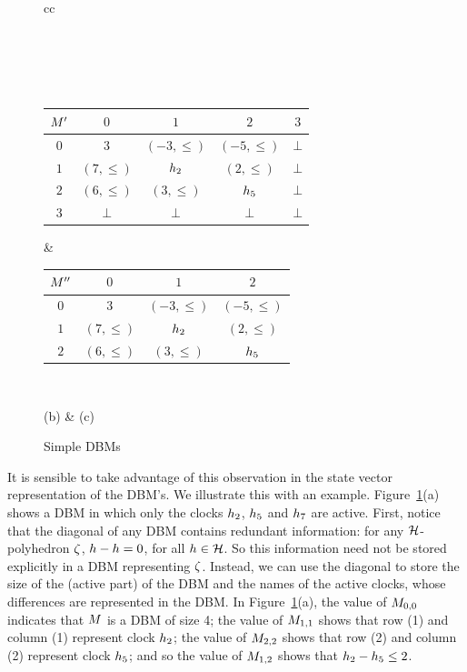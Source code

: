 \begin{description}
\begin{figure}
\begin{center}
\begin{tabular}{cc}
{\begin{tabular}{|>{$}c<{$}|>{$}c<{$}>{$}c<{$}>{$}c<{$}>{$}c<{$}|}
\hline
\end{tabular}
}
\\
 \\ \\
\begin{tabular}{|>{$}c<{$}|>{$}c<{$}>{$}c<{$}>{$}c<{$}>{$}c<{$}|}
\hline
\M' & 0        & 1         & 2         & 3           \\
\hline
0   & 3        & (-3,\leq) & (-5,\leq) & \bot        \\
1   & (7,\leq) & \clock_2  & (2,\leq)  & \bot        \\
2   & (6,\leq) & (3,\leq)  & \clock_5  & \bot        \\
3   & \bot     & \bot      & \bot      & \bot        \\
\hline
\end{tabular}
&
\begin{tabular}{|>{$}c<{$}|>{$}c<{$}>{$}c<{$}>{$}c<{$}|}
\hline
\M''& 0        & 1         & 2         \\
\hline
0   & 3        & (-3,\leq) & (-5,\leq) \\
1   & (7,\leq) & \clock_2  & (2,\leq)  \\
2   & (6,\leq) & (3,\leq)  & \clock_5  \\
\hline
\end{tabular}
\\
\rule{0cm}{.5cm}(b) & (c) \\
\end{tabular}
\end{center}
\caption{Simple DBMs\label{fig:sgdbms}}
\end{figure}
It is sensible to take advantage of this observation in the state
vector representation of the DBM's. We illustrate this with an
example.  Figure~\ref{fig:sgdbms}(a) shows a DBM in which only the
clocks $\clock_2$, $\clock_5$ and $\clock_7$ are active. First, notice
that the diagonal of any DBM contains redundant information: for any
$\clocks$-polyhedron $\vexcond$, $\clock - \clock = 0$, for all
$\clock \in \clocks$. So this information need not be stored
explicitly in a DBM representing $\vexcond$. Instead, we can use the
diagonal to store the size of the (active part) of the DBM and the
names of the active clocks, whose differences are represented in the
DBM. In Figure~\ref{fig:sgdbms}(a), the value of $\M_{0,0}$ indicates
that $\M$ is a DBM of size 4; the value of $\M_{1,1}$ shows that row
(1) and column (1) represent clock $\clock_2$; the value of $\M_{2,2}$
shows that row (2) and column (2) represent clock $\clock_5$; and so
the value of $\M_{1,2}$ shows that $\clock_2 - \clock_5 \leq 2$.


\end{description}
